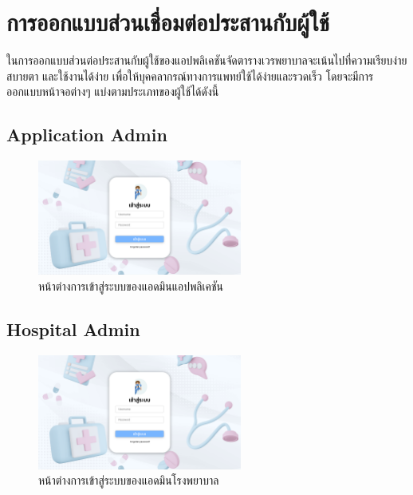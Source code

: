\baselineskip=8mm
\renewcommand{\thesubsection}{\arabic{subsection}.}
\renewcommand{\theequation}{\thesection.\arabic{equation}}
\renewcommand{\thesection}{}
\renewcommand{\thesubsubsection}{\thesubsection\arabic{subsubsection}.}




\section{การออกแบบส่วนเชื่อมต่อประสานกับผู้ใช้}

ในการออกแบบส่วนต่อประสานกับผู้ใช้ของแอปพลิเคชันจัดตารางเวรพยาบาลจะเน้นไปที่ความเรียบง่าย สบายตา และใช้งานได้ง่าย เพื่อให้บุคคลากรณ์ทางการแพทย์ใช้ได้ง่ายและรวดเร็ว โดยจะมีการออกแบบหน้าจอต่างๆ แบ่งตามประเภทของผู้ใช้ได้ดังนี้


\subsection{Application Admin}

\begin{figure}[h]
    \centering
    \includegraphics[width=0.6\textwidth]{Login ui.png}
    \caption{หน้าต่างการเข้าสู่ระบบของแอดมินแอปพลิเคชัน}
    \end{figure}

\subsection{Hospital Admin}

\begin{figure}[h]
    \centering
    \includegraphics[width=0.6\textwidth]{Login ui.png}
    \caption{หน้าต่างการเข้าสู่ระบบของแอดมินโรงพยาบาล}
    \end{figure}

